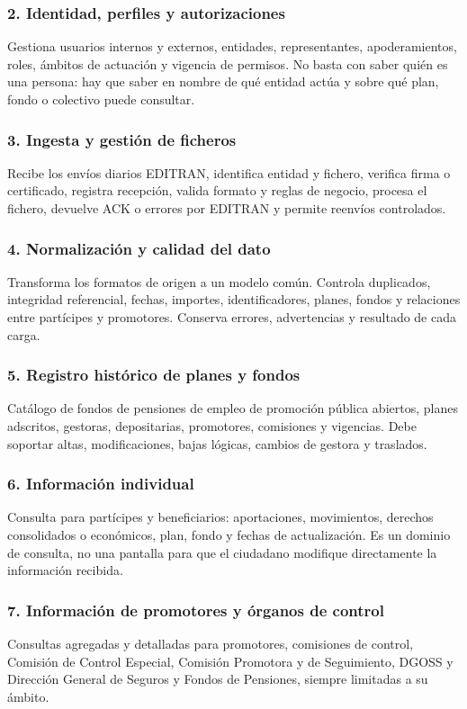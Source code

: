 \documentclass[11pt,a4paper]{article}
\begin{document}
\subsubsection{2. Identidad, perfiles y autorizaciones}
Gestiona usuarios internos y externos, entidades, representantes, apoderamientos, roles, ámbitos de actuación y vigencia de permisos. No basta con saber quién es una persona: hay que saber en nombre de qué entidad actúa y sobre qué plan, fondo o colectivo puede consultar.

\subsubsection{3. Ingesta y gestión de ficheros}
Recibe los envíos diarios EDITRAN, identifica entidad y fichero, verifica firma o certificado, registra recepción, valida formato y reglas de negocio, procesa el fichero, devuelve ACK o errores por EDITRAN y permite reenvíos controlados.

\subsubsection{4. Normalización y calidad del dato}
Transforma los formatos de origen a un modelo común. Controla duplicados, integridad referencial, fechas, importes, identificadores, planes, fondos y relaciones entre partícipes y promotores. Conserva errores, advertencias y resultado de cada carga.

\subsubsection{5. Registro histórico de planes y fondos}
Catálogo de fondos de pensiones de empleo de promoción pública abiertos, planes adscritos, gestoras, depositarias, promotores, comisiones y vigencias. Debe soportar altas, modificaciones, bajas lógicas, cambios de gestora y traslados.

\subsubsection{6. Información individual}
Consulta para partícipes y beneficiarios: aportaciones, movimientos, derechos consolidados o económicos, plan, fondo y fechas de actualización. Es un dominio de consulta, no una pantalla para que el ciudadano modifique directamente la información recibida.

\subsubsection{7. Información de promotores y órganos de control}
Consultas agregadas y detalladas para promotores, comisiones de control, Comisión de Control Especial, Comisión Promotora y de Seguimiento, DGOSS y Dirección General de Seguros y Fondos de Pensiones, siempre limitadas a su ámbito.
\end{document}
